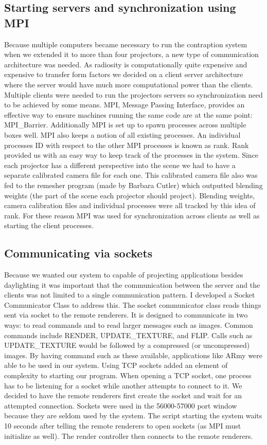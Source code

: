 \subsection{Starting servers and synchronization using MPI}
Because multiple computers became necessary to run the contraption system when we extended it to more than four projectors, a new type of communication architecture was needed.  As radiosity is computationally quite expensive and expensive to transfer form factors we decided on a client server architecture where the server would have much more computational power than the clients.  Multiple clients were needed to run the projectors servers so synchronization need to be achieved by some means.  MPI, Message Passing Interface, provides an effective way to ensure machines running the same code are at the same point: MPI\_Barrier.  Additionally MPI is set up to spawn processes across multiple boxes well.  
MPI also keeps a notion of all existing processes.  An individual processes ID with respect to the other MPI processes is known as rank.  Rank provided us with an easy way to keep track of the processes in the system.  Since each projector has a different perspective into the scene we had to have a separate calibrated camera file for each one.  This calibrated camera file also was fed to the remesher program (made by Barbara Cutler) which outputted blending weights (the part of the scene each projector should project).  Blending weights, camera calibration files and individual processes were all tracked by this idea of rank.
For these reason MPI was used for synchronization across clients as well as starting the client processes.  
\subsection{Communicating via sockets}
Because we wanted our system to capable of projecting applications besides daylighting it was important that the communication between the server and the clients was not limited to a single communication pattern.  I developed a Socket Communicator Class to address this.  The socket communicator class reads things sent via socket to the remote renderers.  It is designed to communicate in two ways: to read commands and to read larger messages such as images.  Common commands include RENDER, UPDATE\_TEXTURE, and FLIP.  Calls such as UPDATE\_TEXTURE would be followed by a compressed (or uncompressed) images.  By having command such as these available, applications like ARmy were able to be used in our system.
Using TCP sockets added an element of complexity to starting our program.  When opening a TCP socket, one process has to be listening for a socket while another attempts to connect to it.  We decided to have the remote renderers first create the socket and wait for an attempted connection.  Sockets were used in the 56000-57000 port window because they are seldom used by the system.  The script starting the system waits 10 seconds after telling the remote renderers to open sockets (as MPI must initialize as well).  The render controller then connects to the remote renderers.

